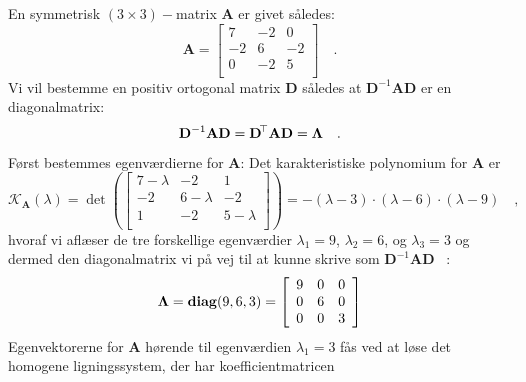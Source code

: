\begin{example} \label{exampLAbog8.22}
En symmetrisk $(3 \times 3)-$matrix $\mathbf{A}$ er givet således:
\begin{equation}
\mathbf{A} = \left[
               \begin{array}{rrr}
                 7 & -2 & 0 \\
                 -2 & 6 & -2 \\
                 0 & -2 & 5 \\
               \end{array}
             \right] \quad .
\end{equation}
Vi vil bestemme en positiv ortogonal matrix $\mathbf{D}$ således at $\mathbf{D}^{-1}\mathbf{A}\mathbf{D}$ er en diagonalmatrix:
\begin{equation}
\mathbf{D}^{-1}\mathbf{A}\mathbf{D} = \mathbf{D}\hspace*{-.6mm}^{\top}\mathbf{A}\mathbf{D} =  \mathbf{\Lambda} \quad .
\end{equation}
Først bestemmes egenværdierne for $\mathbf{A}$: Det karakteristiske polynomium for $\mathbf{A}$ er
\begin{equation}
\mathcal{K}_{\mathbf{A}}(\lambda) = \det\left(\left[
               \begin{array}{rrr}
                 7-\lambda & -2 & 1 \\
                 -2 & 6-\lambda  & -2 \\
                 1 & -2 & 5-\lambda  \\
               \end{array}
             \right] \right)  = -(\lambda-3)\cdot(\lambda-6)\cdot(\lambda - 9) \quad ,
\end{equation}
hvoraf vi aflæser de tre forskellige egenværdier $\lambda_{1}= 9$, $\lambda_{2}= 6$, og $\lambda_{3}= 3$ og dermed
den diagonalmatrix vi på vej til at kunne skrive som $\mathbf{D}^{-1}\mathbf{A}\mathbf{D}$ \, :
\begin{equation}
\mathbf{\Lambda} = \operatorname{\bf{diag}}(9, 6, 3) = \left[
                                  \begin{array}{rrr}
                                    9 & 0 & 0 \\
                                    0 & 6 & 0 \\
                                    0 & 0 & 3 \\
                                  \end{array}
                                \right]
\end{equation}
Egenvektorerne for $\mathbf{A}$ hørende til egenværdien $\lambda_{1} = 3$ fås ved at løse det homogene ligningssystem, der har koefficientmatricen

\end{example}
